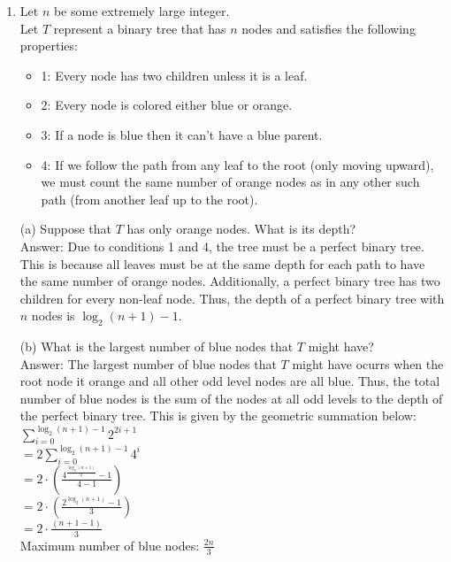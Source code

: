 \documentclass[12pt]{article}
\begin{document}
  
\pagestyle{empty}
 




%
%
%





\begin{enumerate}

\item 
Let $n$ be some extremely large integer.\\
Let $T$ represent a binary tree that has $n$ nodes and satisfies the following properties:

\begin{itemize}
\item  1: Every node has two children unless it is a leaf.
\item  2: Every node is colored either blue or orange.
\item  3: If a node is blue then it can't have a blue parent.
\item  4: If we follow the path from any leaf  to the root (only moving upward), we must count the same number of orange nodes as in any other such path (from another leaf up to the root).
\end{itemize}



(a) Suppose that $T$ has only orange nodes. What is its depth?\\
{\color{blue} Answer: Due to conditions 1 and 4, the tree must be a perfect binary tree. This is because all leaves must be at the same depth for each path
to have the same number of orange nodes. Additionally, a perfect binary tree has two children for every non-leaf node. Thus, the depth of a perfect binary tree with
$n$ nodes is $\log_2(n+1) - 1$.\\
}

(b) What is the largest number of blue nodes that $T$ might have?\\
{\color{blue} Answer: The largest number of blue nodes that $T$ might have ocurrs when the root node it orange and all other odd level nodes are all blue. Thus, the total number of blue nodes 
is the sum of the nodes at all odd levels to the depth of the perfect binary tree. This is given by the geometric summation below:\\
$\sum_{i=0}^{\log_2(n+1)-1} 2^{2i+1}$ \\
$= 2\sum_{i=0}^{\log_2(n+1)-1} 4^i $\\
$= 2 \cdot (\frac{4^{\frac{\log_2(n+1)}{2}}-1}{4-1})$\\
$= 2 \cdot (\frac{2^{\log_2(n+1)}-1}{3})$\\
$= 2\cdot\frac{(n+1-1)}{3}$\\
Maximum number of blue nodes: $\frac{2n}{3}$\\
}




\end{enumerate}
\end{document}
